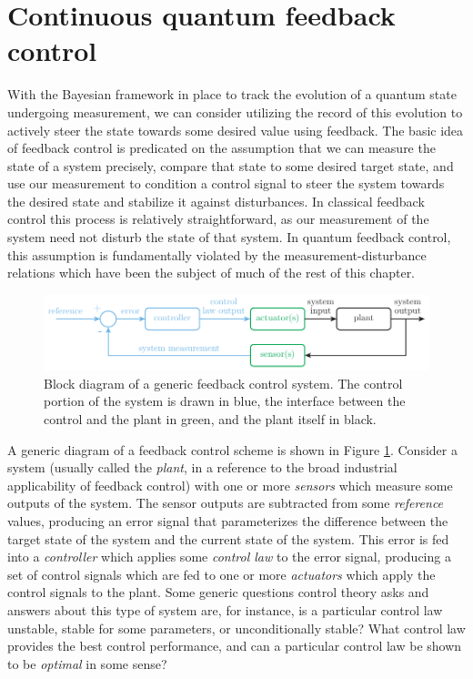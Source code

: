 \section{Continuous quantum feedback control}

With the Bayesian framework in place to track the evolution of a quantum state undergoing measurement, we can consider utilizing the record of this evolution to actively steer the state towards some desired value using feedback. The basic idea of feedback control is predicated on the assumption that we can measure the state of a system precisely, compare that state to some desired target state, and use our measurement to condition a control signal to steer the system towards the desired state and stabilize it against disturbances.  In classical feedback control this process is relatively straightforward, as our measurement of the system need not disturb the state of that system.  In quantum feedback control, this assumption is fundamentally violated by the measurement-disturbance relations which have been the subject of much of the rest of this chapter.

\begin{figure}
\begin{center}
	\includegraphics[width = 6in]{qmeas_chapter/feedback_diagram}
\end{center}
\caption[Generic feedback control system]{Block diagram of a generic feedback control system.  The control portion of the system is drawn in blue, the interface between the control and the plant in green, and the plant itself in black.}
\label{fig:feedback_diagram}
\end{figure}

A generic diagram of a feedback control scheme is shown in Figure \ref{fig:feedback_diagram}.  Consider a system (usually called the \textit{plant}, in a reference to the broad industrial applicability of feedback control) with one or more \textit{sensors} which measure some outputs of the system.  The sensor outputs are subtracted from some \textit{reference} values, producing an error signal that parameterizes the difference between the target state of the system and the current state of the system.  This error is fed into a \textit{controller} which applies some \textit{control law} to the error signal, producing a set of control signals which are fed to one or more \textit{actuators} which apply the control signals to the plant.  Some generic questions control theory asks and answers about this type of system are, for instance, is a particular control law unstable, stable for some parameters, or unconditionally stable?  What control law provides the best control performance, and can a particular control law be shown to be \textit{optimal} in some sense?

